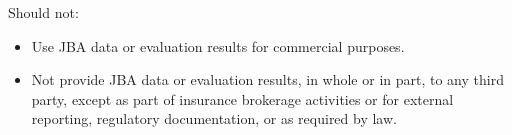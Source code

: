 \documentclass[
]{article}
\begin{document}
\fontsize{11}{13}\selectfont Should not:

\begin{itemize}
  \item {\fontsize{11}{13}\selectfont Use JBA data or evaluation results for commercial      purposes.}
  \item {\fontsize{11}{13}\selectfont Not provide JBA data or evaluation results, in whole   or in part, to any third party, except as part of insurance brokerage activities or for    external reporting, regulatory documentation, or as required by law.}
\end{itemize}
\end{document}
